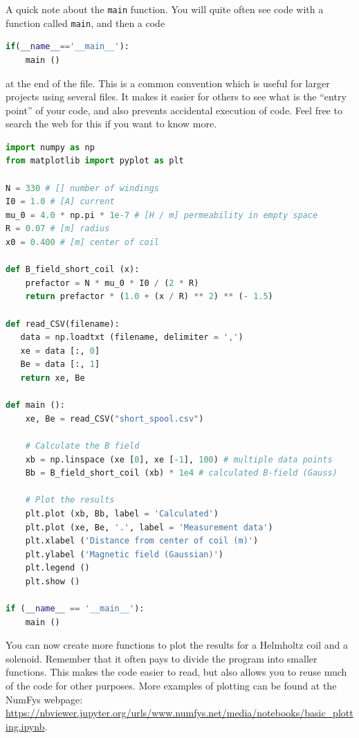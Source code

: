 \documentclass[../Elmag-labhefte-2020.tex]{subfiles}
\begin{document}
\begin{marginlisting}[-3cm]
A quick note about the \texttt{main} function.
You will quite often see code with a function called \texttt{main}, and then a code
\begin{lstlisting}[language=python,style=kaolstplain,breaklines=false]
if(__name__=='__main__'):
    main ()
\end{lstlisting}
at the end of the file.
This is a common convention which is useful for larger projects using several files.
It makes it easier for others to see what is the ``entry point'' of your code, and also prevents accidental execution of code.
Feel free to search the web for this if you want to know more.
\end{marginlisting}
\begin{lstlisting}[language=python]
import numpy as np
from matplotlib import pyplot as plt

N = 330 # [] number of windings
I0 = 1.0 # [A] current
mu_0 = 4.0 * np.pi * 1e-7 # [H / m] permeability in empty space
R = 0.07 # [m] radius
x0 = 0.400 # [m] center of coil

def B_field_short_coil (x):
    prefactor = N * mu_0 * I0 / (2 * R)
    return prefactor * (1.0 + (x / R) ** 2) ** (- 1.5)

def read_CSV(filename):
   data = np.loadtxt (filename, delimiter = ',')
   xe = data [:, 0]
   Be = data [:, 1]
   return xe, Be
    
def main ():
    xe, Be = read_CSV("short_spool.csv")
    
    # Calculate the B field
    xb = np.linspace (xe [0], xe [-1], 100) # multiple data points
    Bb = B_field_short_coil (xb) * 1e4 # calculated B-field (Gauss)
    
    # Plot the results
    plt.plot (xb, Bb, label = 'Calculated')
    plt.plot (xe, Be, '.', label = 'Measurement data')
    plt.xlabel ('Distance from center of coil (m)')
    plt.ylabel ('Magnetic field (Gaussian)')
    plt.legend ()
    plt.show ()
    
if (__name__ == '__main__'):
    main ()
\end{lstlisting}

You can now create more functions to plot the results for a Helmholtz coil and a solenoid. Remember that it often pays to divide the program into smaller functions. This makes the code easier to read, but also allows you to reuse much of the code for other purposes.
More examples of plotting can be found at the NumFys webpage: \url{https://nbviewer.jupyter.org/urls/www.numfys.net/media/notebooks/basic_plotting.ipynb}.
\end{document}
